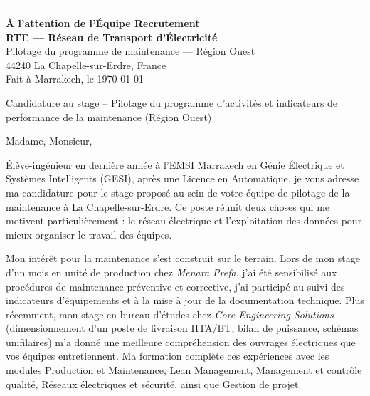 \documentclass[10pt,a4paper]{altacv}
\makeatletter
\renewcommand{\makecvheader}{%
  \begingroup
    \raggedright\color{emphasis}%
    {\LARGE\bfseries\MakeUppercase{\@name}\par}\vspace{2pt}
    {\normalsize\bfseries\color{accent}\@tagline\par}\vspace{4pt}
    {\footnotesize\color{emphasis}\@personalinfo\par}
  \endgroup\vspace{5pt}
  {\color{heading}\rule{\linewidth}{1.2pt}}\par\vspace{7pt}
}
\makeatother
\begin{document}

\makecvheader

\begin{flushright}
  {\color{emphasis}\textbf{À l'attention de l'Équipe Recrutement}} \\[2pt]
  \textbf{RTE — Réseau de Transport d’Électricité} \\
  Pilotage du programme de maintenance — Région Ouest \\
  44240 La Chapelle-sur-Erdre, France \\[6pt]
  Fait à Marrakech, le \today
\end{flushright}
\vspace{4pt}

 Candidature au stage -- Pilotage du programme d'activités et indicateurs de performance de la maintenance (Région Ouest)

\vspace{8pt}

\noindent Madame, Monsieur,

\vspace{6pt}

Élève-ingénieur en dernière année à l'EMSI Marrakech en Génie Électrique et Systèmes Intelligents (GESI), après une Licence en Automatique, je vous adresse ma candidature pour le stage proposé au sein de votre équipe de pilotage de la maintenance à La Chapelle-sur-Erdre. Ce poste réunit deux choses qui me motivent particulièrement : le réseau électrique et l'exploitation des données pour mieux organiser le travail des équipes.

\vspace{6pt}

Mon intérêt pour la maintenance s'est construit sur le terrain. Lors de mon stage d'un mois en unité de production chez \textit{Menara Prefa}, j'ai été sensibilisé aux procédures de maintenance préventive et corrective, j'ai participé au suivi des indicateurs d'équipements et à la mise à jour de la documentation technique. Plus récemment, mon stage en bureau d'études chez \textit{Core Engineering Solutions} (dimensionnement d'un poste de livraison HTA/BT, bilan de puissance, schémas unifilaires) m'a donné une meilleure compréhension des ouvrages électriques que vos équipes entretiennent. Ma formation complète ces expériences avec les modules Production et Maintenance, Lean Management, Management et contrôle qualité, Réseaux électriques et sécurité, ainsi que Gestion de projet.
\end{document}
